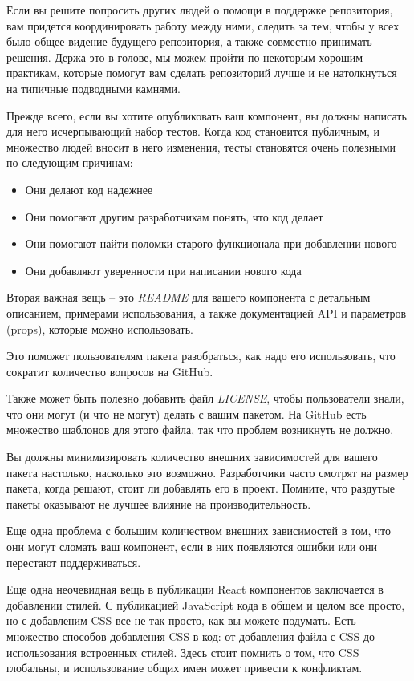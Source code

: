 Если вы решите попросить других людей о помощи в поддержке репозитория, вам придется координировать работу между ними, следить за тем, чтобы у всех было общее видение будущего репозитория, а также совместно принимать решения. Держа это в голове, мы можем пройти по некоторым хорошим практикам, которые помогут вам сделать репозиторий лучше и не натолкнуться на типичные подводными камнями.

Прежде всего, если вы хотите опубликовать ваш компонент, вы должны написать для него исчерпывающий набор тестов. Когда код становится публичным, и множество людей вносит в него изменения, тесты становятся очень полезными по следующим причинам:

\begin{itemize}
  \item Они делают код надежнее
  \item Они помогают другим разработчикам понять, что код делает
  \item Они помогают найти поломки старого функционала при добавлении нового
  \item Они добавляют уверенности при написании нового кода
\end{itemize}

Вторая важная вещь -- это \textit{README} для вашего компонента с детальным описанием, примерами использования, а также документацией API и параметров (props), которые можно использовать.

Это поможет пользователям пакета разобраться, как надо его использовать, что сократит количество вопросов на GitHub.	

Также может быть полезно добавить файл \textit{LICENSE}, чтобы пользователи знали, что они могут (и что не могут) делать с вашим пакетом. На GitHub есть множество шаблонов для этого файла, так что проблем возникнуть не должно.

Вы должны минимизировать количество внешних зависимостей для вашего пакета настолько, насколько это возможно. Разработчики часто смотрят на размер пакета, когда решают, стоит ли добавлять его в проект. Помните, что раздутые пакеты оказывают не лучшее влияние на производительность.

Еще одна проблема с большим количеством внешних зависимостей в том, что они могут сломать ваш компонент, если в них появляются ошибки или они перестают поддерживаться.

Еще одна неочевидная вещь в публикации React компонентов заключается в добавлении стилей. С публикацией JavaScript кода в общем и целом все просто, но с добавленим CSS все не так просто, как вы можете подумать. Есть множество способов добавления CSS в код: от добавления файла с CSS до использования встроенных стилей. Здесь стоит помнить о том, что CSS глобальны, и использование общих имен может привести к конфликтам.

